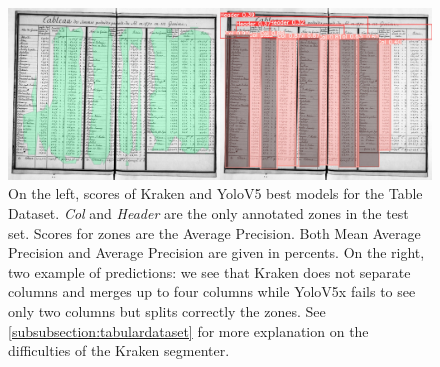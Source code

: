 \documentclass{jdmdh}
\begin{document}
\begin{figure}
\begin{minipage}{.5\linewidth}
\centering
{}
\end{minipage}%
\begin{minipage}{.5\linewidth}
\includegraphics[width=\linewidth]{images/tableexemple.jpg}
\end{minipage}%
\label{tab:scores:table}
\caption{On the left, scores of Kraken and YoloV5 best models for the Table Dataset. \textit{Col} and \textit{Header} are the only annotated zones in the test set. Scores for zones are the Average Precision. Both Mean Average Precision and Average Precision are given in percents. On the right, two example of predictions: we see that Kraken does not separate columns and merges up to four columns while YoloV5x fails to see only two columns but splits correctly the zones. See \ref{subsubsection:tabulardataset} for more explanation on the difficulties of the Kraken segmenter.}
\end{figure}
\end{document}
